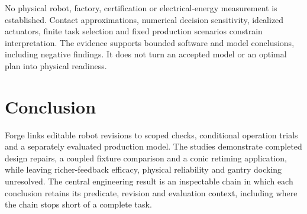 No physical robot, factory, certification or electrical-energy measurement is established. Contact approximations, numerical decision sensitivity, idealized actuators, finite task selection and fixed production scenarios constrain interpretation. The evidence supports bounded software and model conclusions, including negative findings. It does not turn an accepted model or an optimal plan into physical readiness.

\section{Conclusion}
Forge links editable robot revisions to scoped checks, conditional operation trials and a separately evaluated production model. The studies demonstrate completed design repairs, a coupled fixture comparison and a conic retiming application, while leaving richer-feedback efficacy, physical reliability and gantry docking unresolved. The central engineering result is an inspectable chain in which each conclusion retains its predicate, revision and evaluation context, including where the chain stops short of a complete task.



